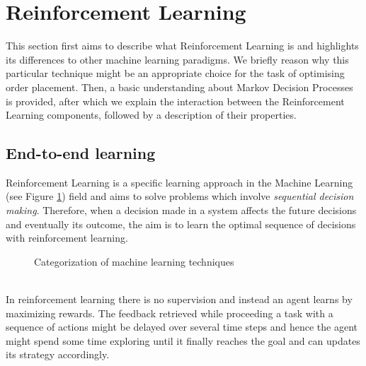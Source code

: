 \section{Reinforcement Learning}

This section first aims to describe what Reinforcement Learning is and highlights its differences to other machine learning paradigms. 
We briefly reason why this particular technique might be an appropriate choice for the task of optimising order placement. 
Then, a basic understanding about Markov Decision Processes is provided, after which we explain the interaction between the Reinforcement Learning components, followed by a description of their properties.

\subsection{End-to-end learning}

Reinforcement Learning is a specific learning approach in the Machine Learning (see Figure \ref{fig:ml-rl}) field and aims to solve problems which involve \textit{sequential decision making}.
Therefore, when a decision made in a system affects the future decisions and eventually its outcome, the aim is to learn the optimal sequence of decisions with reinforcement learning.

\begin{figure}[H]
    \centering
    \caption{Categorization of machine learning techniques}
    \label{fig:ml-rl}
\end{figure}
\hfill
\\
In reinforcement learning there is no supervision and instead an agent learns by maximizing rewards.
The feedback retrieved while proceeding a task with a sequence of actions might be delayed over several time steps and hence the agent might spend some time exploring until it finally reaches the goal and can updates its strategy accordingly.

